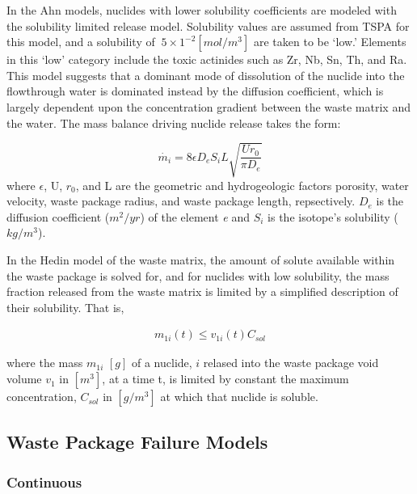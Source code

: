 In the Ahn models, nuclides with lower solubility coefficients are 
modeled with the solubility limited release model.  Solubility values 
are assumed from TSPA for this model, and a solubility of $~5\times 
1^{-2} [mol/m^3]$ are taken to be `low.' Elements in this `low' 
category include the toxic actinides such as Zr, Nb, Sn, Th, and Ra.  
This model suggests that a dominant mode of dissolution of the nuclide 
into the flowthrough water is dominated instead by the diffusion 
coefficient, which is largely dependent upon the concentration 
gradient between the waste matrix and the water. The mass balance 
driving nuclide release takes the form:

\begin{equation}
\dot{m_i}=8\epsilon D_eS_iL\sqrt{\frac{Ur_0}{\pi D_e}}
\end{equation}
where $\epsilon$, U, $r_0$, and L are the geometric and hydrogeologic 
factors porosity, water velocity, waste package radius, and waste 
package length, repsectively. $D_e$ is the diffusion coefficient 
($m^2/yr$) of the element \emph{e} and $S_i$ is the isotope's 
solubility ($kg/m^3$).

In the Hedin model of the waste matrix, the amount of solute available 
within the waste package is solved for, and for nuclides with low 
solubility, the mass fraction released from the waste matrix is 
limited by a simplified description of their solubility. That is, 

\begin{align*}
  m_{1i}(t)\le v_{1i}(t)C_{sol}
\end{align*}

where the mass $m_{1i}$ $[g]$ of a nuclide, $i$ relased into the waste 
package void volume $v_1$ in $[m^3]$, at a time t, is limited by 
constant the maximum concentration, $C_{sol}$ in $[g/m^3]$ at which 
that nuclide is soluble. \cite{hedin_integrated_2002}


\subsection{Waste Package Failure Models}



\subsubsection{Continuous}

